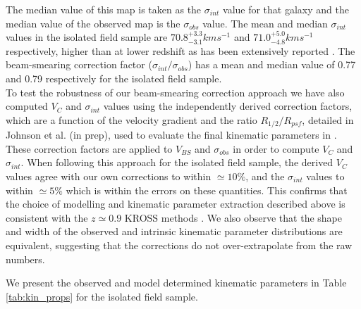 \documentclass[fleqn,usenatbib]{mn2e}
\begin{document}
The median value of this map is taken as the $\sigma_{int}$ value for that galaxy and the median value of the observed map is the $\sigma_{obs}$ value.
The mean and median $\sigma_{int}$ values in the isolated field sample are $70.8^{+3.3}_{-3.1} kms^{-1}$ and $71.0^{+5.0}_{-4.8} kms^{-1}$ respectively, higher than at lower redshift as has been extensively reported \citep[e.g.][]{Genzel2006,Genzel2008,ForsterSchreiber2009,Law2009,Gnerucci2011,Epinat2012,Wisnioski2015}.
The beam-smearing correction factor ($\sigma_{int}/\sigma_{obs}$) has a mean and median value of 0.77 and 0.79 respectively for the isolated field sample. \\

To test the robustness of our beam-smearing correction approach we have also computed $V_{C}$ and $\sigma_{int}$ values using the independently derived correction factors, which are a function of the velocity gradient and the ratio $R_{1/2}/R_{psf}$, detailed in Johnson et al. (in prep), used to evaluate the final kinematic parameters in \cite{Harrison2017}.
These correction factors are applied to $V_{BS}$ and $\sigma_{obs}$ in order to compute $V_{C}$ and $\sigma_{int}$.
When following this approach for the isolated field sample, the derived $V_{C}$ values agree with our own corrections to within $\simeq10\%$, and the $\sigma_{int}$ values to within $\simeq5\%$ which is within the errors on these quantities. 
This confirms that the choice of modelling and kinematic parameter extraction described above is consistent with the $z\simeq0.9$ KROSS methods \citep{Harrison2017}.
We also observe that the shape and width of the observed and intrinsic kinematic parameter distributions are equivalent, suggesting that the corrections do not over-extrapolate from the raw numbers.

We present the observed and model determined kinematic parameters in Table \ref{tab:kin_props} for the isolated field sample.
\end{document}
